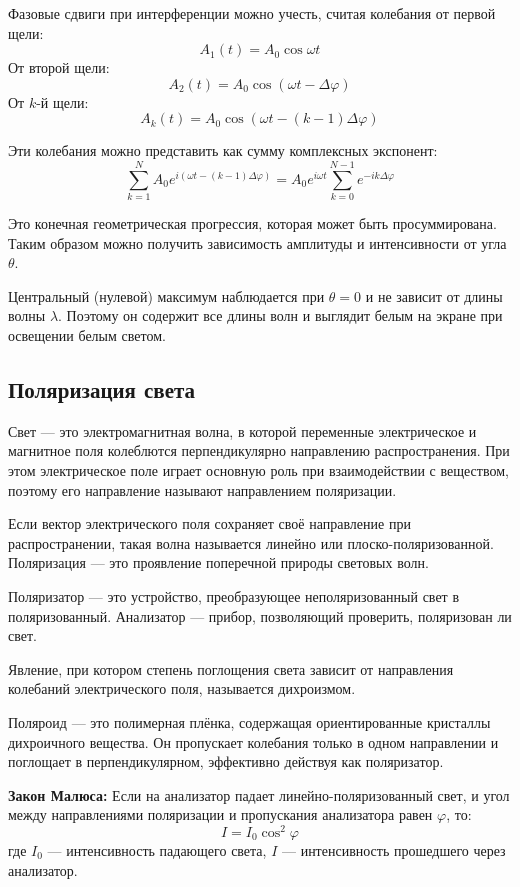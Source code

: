 \documentclass[12pt]{article}
\begin{document}
Фазовые сдвиги при интерференции можно учесть, считая колебания от первой щели:
\[
A_1(t) = A_0 \cos \omega t
\]
От второй щели:
\[
A_2(t) = A_0 \cos(\omega t - \Delta \varphi)
\]
От $k$-й щели:
\[
A_k(t) = A_0 \cos\left(\omega t - (k - 1)\Delta \varphi\right)
\]

Эти колебания можно представить как сумму комплексных экспонент:
\[
\sum_{k=1}^N A_0 e^{i(\omega t - (k - 1)\Delta \varphi)} = A_0 e^{i\omega t} \sum_{k=0}^{N-1} e^{-i k \Delta \varphi}
\]

Это конечная геометрическая прогрессия, которая может быть просуммирована. Таким образом можно получить зависимость амплитуды и интенсивности от угла $\theta$.

Центральный (нулевой) максимум наблюдается при $\theta = 0$ и не зависит от длины волны $\lambda$. Поэтому он содержит все длины волн и выглядит белым на экране при освещении белым светом.


\subsection{Поляризация света}

Свет — это электромагнитная волна, в которой переменные электрическое и магнитное поля колеблются перпендикулярно направлению распространения. При этом электрическое поле играет основную роль при взаимодействии с веществом, поэтому его направление называют направлением поляризации.

Если вектор электрического поля сохраняет своё направление при распространении, такая волна называется линейно или плоско-поляризованной. Поляризация — это проявление поперечной природы световых волн.

Поляризатор — это устройство, преобразующее неполяризованный свет в поляризованный. Анализатор — прибор, позволяющий проверить, поляризован ли свет.

Явление, при котором степень поглощения света зависит от направления колебаний электрического поля, называется дихроизмом. 

Поляроид — это полимерная плёнка, содержащая ориентированные кристаллы дихроичного вещества. Он пропускает колебания только в одном направлении и поглощает в перпендикулярном, эффективно действуя как поляризатор.

\textbf{Закон Малюса:}
Если на анализатор падает линейно-поляризованный свет, и угол между направлениями поляризации и пропускания анализатора равен $\varphi$, то:
\[
I = I_0 \cos^2 \varphi
\]
где $I_0$ — интенсивность падающего света, $I$ — интенсивность прошедшего через анализатор.
\end{document}
